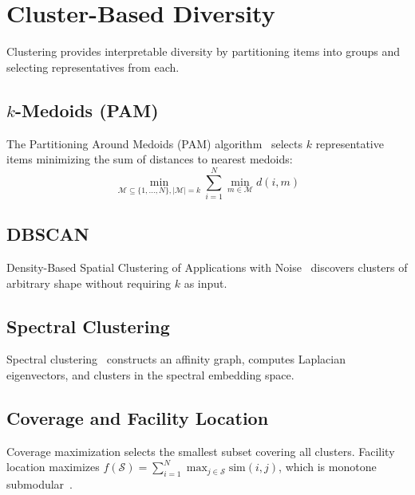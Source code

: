 \documentclass[11pt]{article}
\begin{document}
\section{Cluster-Based Diversity}
\label{sec:clustering}

Clustering provides interpretable diversity by partitioning items into groups
and selecting representatives from each.

\subsection{$k$-Medoids (PAM)}

The Partitioning Around Medoids (PAM) algorithm~\citep{kaufman1990finding}
selects $k$ representative items minimizing the sum of distances to nearest
medoids:
\begin{equation}
\min_{\mathcal{M} \subseteq \{1,\ldots,N\}, |\mathcal{M}|=k}
  \sum_{i=1}^N \min_{m \in \mathcal{M}} d(i, m)
\end{equation}

\subsection{DBSCAN}

Density-Based Spatial Clustering of Applications with
Noise~\citep{ester1996density} discovers clusters of arbitrary shape without
requiring $k$ as input.

\subsection{Spectral Clustering}

Spectral clustering~\citep{ng2002spectral} constructs an affinity graph,
computes Laplacian eigenvectors, and clusters in the spectral embedding space.

\subsection{Coverage and Facility Location}

Coverage maximization selects the smallest subset covering all clusters.
Facility location maximizes $f(\mathcal{S}) = \sum_{i=1}^N \max_{j \in \mathcal{S}} \text{sim}(i, j)$,
which is monotone submodular~\citep{cornuejols1977uncapacitated}.
\end{document}
